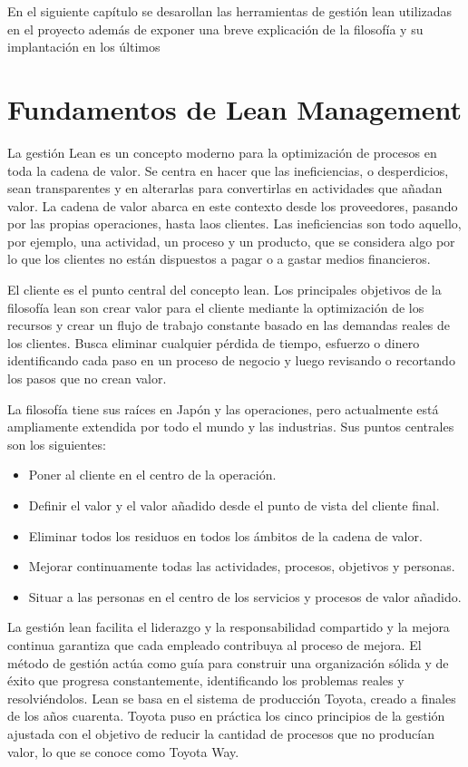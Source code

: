 En el siguiente capítulo se desarollan las herramientas de gestión lean utilizadas en el proyecto además de exponer una breve explicación de la filosofía y su implantación en los últimos

\section{Fundamentos de Lean Management}

La gestión Lean es un concepto moderno para la optimización de procesos en toda la cadena de valor.
Se centra en hacer que las ineficiencias, o desperdicios, sean transparentes y en alterarlas para convertirlas en actividades que añadan valor.
La cadena de valor abarca en este contexto desde los proveedores, pasando por las propias operaciones, hasta laos clientes.
Las ineficiencias son todo aquello, por ejemplo, una actividad, un proceso y un producto, que se considera algo por lo que los clientes no están dispuestos a pagar o a gastar medios financieros.

El cliente es el punto central del concepto lean.
Los principales objetivos de la filosofía lean son crear valor para el cliente mediante la optimización de los recursos y crear un flujo de trabajo constante basado en las demandas reales de los clientes. Busca eliminar cualquier pérdida de tiempo, esfuerzo o dinero identificando cada paso en un proceso de negocio y luego revisando o recortando los pasos que no crean valor.

La filosofía tiene sus raíces en Japón y las operaciones, pero actualmente está ampliamente extendida por todo el mundo y las industrias. Sus puntos centrales son los siguientes:

\begin{itemize}
    \item Poner al cliente en el centro de la operación.
    \item Definir el valor y el valor añadido desde el punto de vista del cliente final.
    \item Eliminar todos los residuos en todos los ámbitos de la cadena de valor.
    \item Mejorar continuamente todas las actividades, procesos, objetivos y personas.
    \item Situar a las personas en el centro de los servicios y procesos de valor añadido.
\end{itemize}

La gestión lean facilita el liderazgo y la responsabilidad compartido y la mejora continua garantiza que cada empleado contribuya al proceso de mejora.
El método de gestión actúa como guía para construir una organización sólida y de éxito que progresa constantemente, identificando los problemas reales y resolviéndolos.
Lean se basa en el sistema de producción Toyota, creado a finales de los años cuarenta.
Toyota puso en práctica los cinco principios de la gestión ajustada con el objetivo de reducir la cantidad de procesos que no producían valor, lo que se conoce como Toyota Way.

